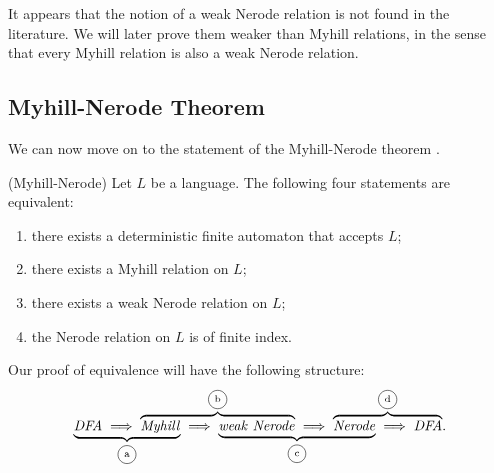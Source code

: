 It appears that the notion of a weak Nerode relation is not found in the literature.
We will later prove them weaker than Myhill relations, in the sense that every Myhill relation is also a weak Nerode relation.

\subsection{Myhill-Nerode Theorem}
We can now move on to the statement of the Myhill-Nerode theorem \cite{DBLP:books/daglib/0088160}.



\begin{theorem}{(Myhill-Nerode)}
    \label{Myhill-Nerode}
    Let $L$ be a language. The following four statements are equivalent:
    \begin{enumerate}
        \item there exists a deterministic finite automaton that accepts $L$;
        \item there exists a Myhill relation on $L$;
        \item there exists a weak Nerode relation on $L$;
        \item the Nerode relation on $L$ is of finite index.
    \end{enumerate}
\end{theorem}

Our proof of equivalence will have the following structure:
\begin{equation*}
    \lefteqn{
        \underbrace{
            \phantom{
                \mathit{DFA} 
                \implies
                \mathit{Myhill} 
            }
        }_\text{\circled{a}}
    }
            \mathit{DFA} 
            \implies
    \lefteqn{
        \overbrace{
            \phantom{
                \mathit{Myhill}
                \implies
                \mathit{weak}_\textrm{} \; \mathit{Nerode} 
            }
        }^\text{\circled{b}}
    }
    \mathit{Myhill}
    \implies
    \lefteqn{
        \underbrace{
            \phantom{
                \mathit{weak}_\textrm{} \; \mathit{Nerode} 
                \implies
                \mathit{Nerode}
            }
        }_\text{\circled{c}} 
    }
    \mathit{weak}_\textrm{} \; \mathit{Nerode} 
    \implies
    \lefteqn{
        \overbrace{
            \phantom{
                \mathit{Nerode}
                \implies
                \mathit{DFA}
            }
        }^\text{\circled{d}} 
    }
    \mathit{Nerode}
    \implies
    \mathit{DFA}.
\end{equation*}


